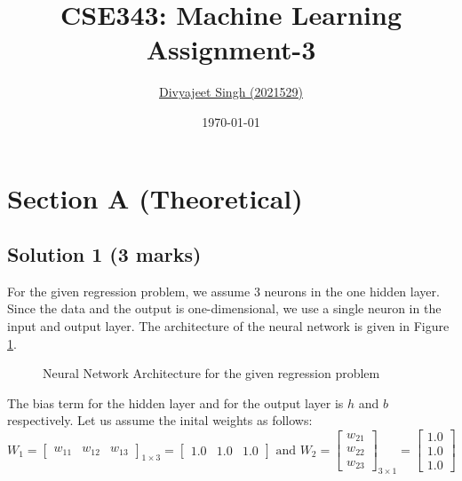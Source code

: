 \documentclass[12pt]{article}
\title{
    \textbf{CSE343: Machine Learning} \\ \vspace*{-5pt}
    \textbf{\large{Assignment-3}}
}
\author{\href{mailto:divyajeet21529@iiitd.ac.in}{Divyajeet Singh (2021529)}}
\date{\today}
\begin{document}
    \maketitle

    \section{Section A (Theoretical)}
    \subsection*{Solution 1 (3 marks)}
    For the given regression problem, we assume 3 neurons in the one hidden layer.
    Since the data and the output is one-dimensional, we use a single neuron in the
    input and output layer. The architecture of the neural network is given in Figure
    \ref{fig:nn}.
    \begin{figure}[htbp]
        \centering
        \caption{Neural Network Architecture for the given regression problem}
        \label{fig:nn}
    \end{figure}
    The bias term for the hidden layer and for the output layer is $h$ and $b$ respectively.
    Let us assume the inital weights as follows:
    \begin{equation*}
        W_{1} = \begin{bmatrix}
            w_{11} & w_{12} & w_{13}
        \end{bmatrix}_{1 \times 3} = \begin{bmatrix}
            1.0 & 1.0 & 1.0
        \end{bmatrix} \text{ and }
        W_{2} = \begin{bmatrix}
            w_{21} \\ w_{22} \\ w_{23}
        \end{bmatrix}_{3 \times 1} = \begin{bmatrix}
            1.0 \\ 1.0 \\ 1.0
        \end{bmatrix}
    \end{equation*}
\end{document}
